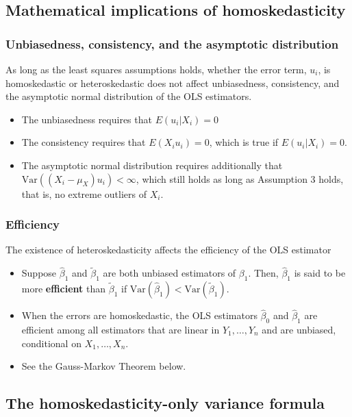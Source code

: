 \documentclass[a4paper,11pt]{article}
\newcommand{\var}{\mathrm{Var}}
\begin{document}
\subsection{Mathematical implications of homoskedasticity}
\label{sec:org93c84e8}

\subsubsection*{Unbiasedness, consistency, and the asymptotic distribution}
\label{sec:orge43d4c2}

As long as the least squares assumptions holds, whether the error
term, \(u_i\), is homoskedastic or heteroskedastic does not affect
unbiasedness, consistency, and the asymptotic normal distribution
of the OLS estimators.
\begin{itemize}
\item The unbiasedness requires that \(E(u_i|X_i) = 0\)
\item The consistency requires that \(E(X_i u_i) = 0\), which is true if
\(E(u_i|X_i)=0\).
\item The asymptotic normal distribution requires additionally that
\(\var((X_i-\mu_X)u_i) < \infty\), which still holds as long as
Assumption 3 holds, that is, no extreme outliers of \(X_i\).
\end{itemize}

\subsubsection*{Efficiency}
\label{sec:orgf1fc015}

The existence of heteroskedasticity affects the efficiency of the
OLS estimator
\begin{itemize}
\item Suppose \(\hat{\beta}_1\) and \(\tilde{\beta}_1\) are both unbiased
estimators of \(\beta_1\). Then, \(\hat{\beta}_1\) is said to be more
\textbf{efficient} than \(\tilde{\beta}_1\) if \(\var(\hat{\beta}_1) <
  \var(\tilde{\beta}_1)\).
\item When the errors are homoskedastic, the OLS estimators
\(\hat{\beta}_0\) and \(\hat{\beta}_1\) are efficient among all
estimators that are linear in \(Y_1, \ldots, Y_n\) and are unbiased,
conditional on \(X_1, \ldots, X_n\).

\item See the Gauss-Markov Theorem below.
\end{itemize}


\subsection{The homoskedasticity-only variance formula}
\label{sec:org7fa009d}
\end{document}
